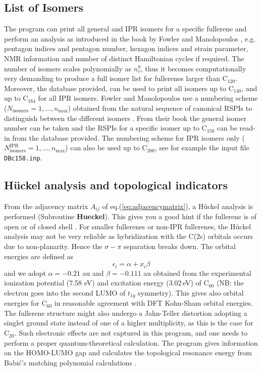 \documentclass[article,a4paper,twoside]{memoir}
\newcommand{\C}[1]{\ensuremath{\mathrm{C}_{#1}}}
\newcommand{\filename}[1]{\texttt{#1}}
\newcommand{\funname}[1]{{\color{blue}\textbf{#1}}}
\begin{document}
\subsection{List of Isomers}
The program can print all general and IPR isomers for a specific fullerene and perform an analysis as introduced 
in the book by Fowler and Manolopoulos \cite{Atlas}, e.g. pentagon indices and 
pentagon number, hexagon indices and strain parameter, NMR information and number of distinct Hamiltonian cycles if 
required. The number of isomers scales polynomially as $n_v^9$, thus it becomes computationally
very demanding to produce a full isomer list for fullerenes larger than \C{120}. Moreover, the database provided, can be used to print all isomers up to 
\C{140}, and up to \C{184} for all IPR isomers. Fowler and Manolopoulos use a numbering scheme ($N_\mathrm{isomers}= 1,\dots, n_\mathrm{max}$) 
obtained from the natural sequence of canonical RSPIs to distinguish between the different isomers \cite{Atlas}. From their book \cite{Atlas} the
general isomer number can be taken and the RSPIs for a specific isomer up to \C{150} can be read-in from the database provided. 
The numbering scheme for IPR isomers only ($N_\mathrm{isomers}^\mathrm{IPR}= 1,\dots, n_\mathrm{max}$) can also be used up to \C{200}, 
see for example the input file \filename{DBc158.inp}.

\subsection{H\"uckel analysis and topological indicators}
From the adjacency matrix $A_{ij}$ of eq.(\ref{eq:adjacencymatrix}), a H\"uckel analysis
is performed (Subroutine \funname{Hueckel}).  This gives you a good hint if the fullerene
is of open or of closed shell \cite{Atlas}.  For smaller fullerenes or non-IPR fullerenes,
the H\"uckel analysis may not be very reliable as hybridization with the C(2s) orbitals
occurs due to non-planarity.  Hence the $\sigma-\pi$ separation breaks down.  The
orbital energies are defined as
\begin{equation}
  \label{Hueckel}
  \epsilon_i=\alpha+x_i\beta
\end{equation}
and we adopt $\alpha = -0.21$ au  and  $\beta = -0.111$ au obtained from the experimental
ionization potential (7.58 eV) and excitation energy (3.02\,eV) of \C{60} (NB: the
electron goes into the second LUMO of $t_{1g}$ symmetry).  This gives also orbital
energies for \C{60} in reasonable agreement with DFT Kohn-Sham orbital energies.
The fullerene structure might also undergo a Jahn-Teller distortion adopting a singlet 
ground state instead of one of a higher multiplicity, as this is the case for \C{20}.
Such electronic effects are not captured in this program, and one needs to perform
a proper quantum-theoretical calculation. The program gives information on the HOMO-LUMO
gap and calculates the topological resonance energy from Babi\'c's matching polynomial
calculations \cite{Babic1995,Babic1997}.
\end{document}
